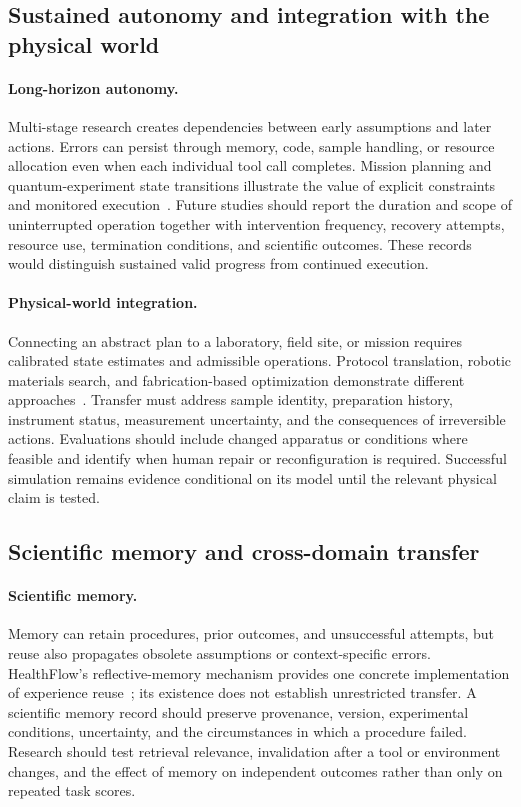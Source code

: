 \subsection{Sustained autonomy and integration with the physical world}

\paragraph{Long-horizon autonomy.}
Multi-stage research creates dependencies between early assumptions and later actions. Errors can persist through memory, code, sample handling, or resource allocation even when each individual tool call completes. Mission planning and quantum-experiment state transitions illustrate the value of explicit constraints and monitored execution~\cite{asd0645,asd0090}. Future studies should report the duration and scope of uninterrupted operation together with intervention frequency, recovery attempts, resource use, termination conditions, and scientific outcomes. These records would distinguish sustained valid progress from continued execution.

\paragraph{Physical-world integration.}
Connecting an abstract plan to a laboratory, field site, or mission requires calibrated state estimates and admissible operations. Protocol translation, robotic materials search, and fabrication-based optimization demonstrate different approaches~\cite{asd0600,burger2020,asd0504}. Transfer must address sample identity, preparation history, instrument status, measurement uncertainty, and the consequences of irreversible actions. Evaluations should include changed apparatus or conditions where feasible and identify when human repair or reconfiguration is required. Successful simulation remains evidence conditional on its model until the relevant physical claim is tested.

\subsection{Scientific memory and cross-domain transfer}

\paragraph{Scientific memory.}
Memory can retain procedures, prior outcomes, and unsuccessful attempts, but reuse also propagates obsolete assumptions or context-specific errors. HealthFlow's reflective-memory mechanism provides one concrete implementation of experience reuse~\cite{asd0002}; its existence does not establish unrestricted transfer. A scientific memory record should preserve provenance, version, experimental conditions, uncertainty, and the circumstances in which a procedure failed. Research should test retrieval relevance, invalidation after a tool or environment changes, and the effect of memory on independent outcomes rather than only on repeated task scores.

